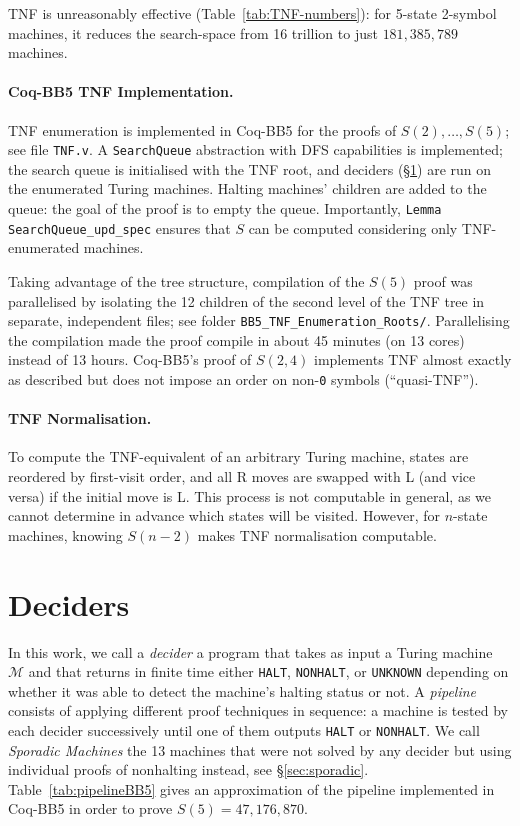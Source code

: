 \documentclass[sigconf,screen]{acmart}
\theoremstyle{definition} %
\numberwithin{equation}{section}
\theoremstyle{definition} %
\newcommand{\szero}{\texttt{0}\xspace}
\newcommand{\BBtheFifth}{47{,}176{,}870}
\newcommand{\BBtheFifthTNF}{181{,}385{,}789}
\newcommand{\numSporadic}{13\xspace}
\newcommand{\HALT}{\texttt{HALT}\xspace}
\newcommand{\NONHALT}{\texttt{NONHALT}\xspace}
\newcommand{\UNKNOWN}{\texttt{UNKNOWN}\xspace}
\newcommand{\CoqBB}{Coq-BB5\xspace}
\begin{document}
TNF is unreasonably effective (Table~\ref{tab:TNF-numbers}): for 5-state 2-symbol machines, it reduces the search-space from 16 trillion to just $\BBtheFifthTNF$ machines.

\paragraph{\CoqBB TNF Implementation.} TNF enumeration is implemented in \CoqBB for the proofs of $S(2),\dots,S(5)$; see file \texttt{TNF.v}. A \texttt{Search\-Queue} abstraction with DFS capabilities is implemented; the search queue is initialised with the TNF root, and deciders (\S\ref{sec:deciders}) are run on the enumerated Turing machines. Halting machines' children are added to the queue: the goal of the proof is to empty the queue. Importantly, \texttt{Lemma Search\-Queue\_upd\_spec} ensures that $S$ can be computed considering only TNF-enumerated machines.

Taking advantage of the tree structure, compilation of the $S(5)$ proof was parallelised by isolating the 12 children of the second level of the TNF tree in separate, independent files; see folder \texttt{BB5\_TNF\_Enumeration\_\allowbreak Roots/}. Parallelising the compilation made the proof compile in about 45 minutes (on 13 cores) instead of 13 hours. \CoqBB's proof of $S(2,4)$ implements TNF almost exactly as described but does not impose an order on non-\szero symbols (``quasi-TNF'').

\paragraph{TNF Normalisation.} To compute the TNF-equivalent of an arbitrary Turing machine, states are reordered by first-visit order, and all R moves are swapped with L (and vice versa) if the initial move is L. This process is not computable in general, as we cannot determine in advance which states will be visited. However, for $n$-state machines, knowing $S(n-2)$ makes TNF normalisation computable.


\section{Deciders}\label{sec:deciders}

In this work, we call a \textit{decider} a program that takes as input a Turing machine $\mathcal{M}$ and that returns in finite time either \HALT, \NONHALT, or \UNKNOWN depending on whether it was able to detect the machine's halting status or not. A \textit{pipeline} consists of applying different proof techniques in sequence: a machine is tested by each decider successively until one of them outputs \HALT or \NONHALT. We call \textit{Sporadic Machines} the \numSporadic machines that were not solved by any decider but using individual proofs of nonhalting instead, see \S\ref{sec:sporadic}. Table~\ref{tab:pipelineBB5} gives an approximation of the pipeline implemented in \CoqBB in order to prove $S(5) = \BBtheFifth$.
\end{document}
